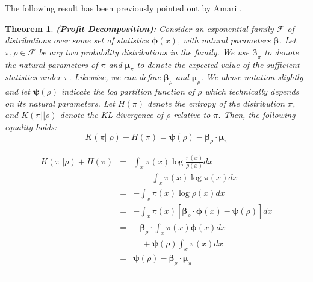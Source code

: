\documentclass{article}
\newcommand{\family}{\mathcal F}
\newcommand{\betavec}{\pmb{\beta}}
\newcommand{\muvec}{\pmb{\mu}}
\newcommand{\lpf}{\mathbf{\psi}} %
\newcommand{\suff}{\pmb{\phi}} %
\newtheorem{theorem}{Theorem}
\newcommand{\qed}{\hfill\rule{7pt}{7pt}}
\newenvironment{proof}{\noindent{\bf Proof:}}{\qed\medskip}
\begin{document}
The following result has been previously pointed out by Amari \cite{Amari-KL}. 
\begin{theorem}\label{lem:profit_decomposition}{\bf (Profit Decomposition)}: Consider an exponential 
family $\family$ of distributions over some set of statistics $\suff(x)$, with natural parameters $\betavec$. Let $\pi, \rho \in \family$ be any two probability distributions in the family. We use 
$\betavec_\pi$ to denote the natural parameters of $\pi$ and $\muvec_{\pi}$ to denote the expected value of the sufficient statistics under $\pi$. Likewise,
we can define $\betavec_\rho$ and  $\muvec_\rho$. We abuse notation slightly and let $\lpf(\rho)$ indicate the log partition function of $\rho$ which technically depends on its natural parameters.
Let $H(\pi)$ denote the entropy of the distribution $\pi$, and 
 $K(\pi||\rho)$ denote the KL-divergence of $\rho$ relative to $\pi$.
Then, the following equality holds:  
\begin{equation}
 K(\pi||\rho) + H(\pi) = \lpf(\rho) - \betavec_\rho \cdot \muvec_\pi
\label{eq:profit_decomposition}
\end{equation}
\end{theorem}
\begin{proof}
\begin{eqnarray*}
 K(\pi||\rho) + H(\pi) &=& \int_x \pi(x)\log{\frac{\pi(x)}{\rho(x)}}dx\\
 &&\quad - \int_x \pi(x)\log{\pi(x)}dx \\
&=& - \int_x \pi(x)\log{\rho(x)}dx \\
&=& - \int_x \pi(x)\left[ \betavec_\rho \cdot \suff(x) - \lpf(\rho)\right]dx\\
&=& - \betavec_\rho \cdot \int_x \pi(x) \suff(x) dx\\
&&\quad + \lpf(\rho) \int_x \pi(x) dx \\
&=&  \lpf(\rho) - \betavec_\rho \cdot \muvec_\pi
\end{eqnarray*}
\end{proof}
\end{document}
